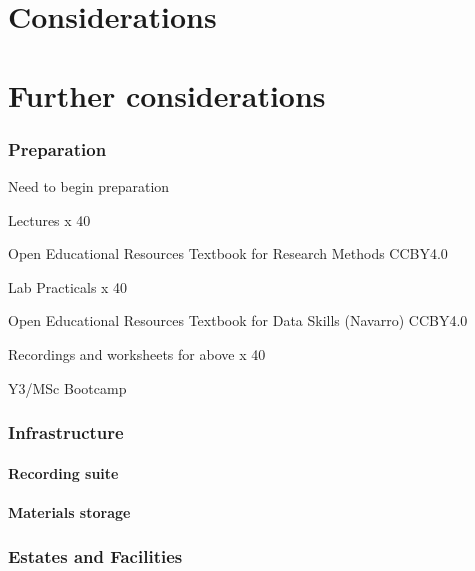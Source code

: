 \documentclass[
  11pt,
  letterpaper,
  oneside,
  open=any]{scrbook}
\begin{document}

\hypertarget{considerations}{%
\chapter{Considerations}\label{considerations}}


\hypertarget{further-considerations}{%
\chapter{Further considerations}\label{further-considerations}}

\hypertarget{preparation}{%
\subsection{Preparation}\label{preparation}}

Need to begin preparation

Lectures x 40

Open Educational Resources Textbook for Research Methods CCBY4.0

Lab Practicals x 40

Open Educational Resources Textbook for Data Skills (Navarro) CCBY4.0

Recordings and worksheets for above x 40

Y3/MSc Bootcamp

\hypertarget{infrastructure}{%
\subsection{Infrastructure}\label{infrastructure}}

\hypertarget{recording-suite}{%
\subsubsection{Recording suite}\label{recording-suite}}

\hypertarget{materials-storage}{%
\subsubsection{Materials storage}\label{materials-storage}}

\hypertarget{estates-and-facilities}{%
\subsection{Estates and Facilities}\label{estates-and-facilities}}
\end{document}

